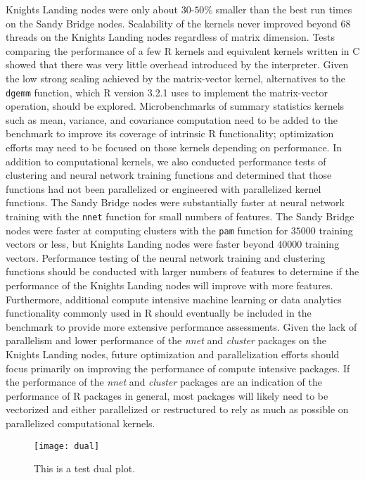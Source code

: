   Knights Landing nodes were only about $30$-$50\%$ smaller than the best run
  times on the Sandy Bridge nodes.
Scalability of the kernels never improved beyond $68$ threads on the Knights
  Landing nodes regardless of matrix dimension.
Tests comparing the performance of a few R kernels and equivalent kernels
  written in C showed that there was very little overhead introduced by the
  interpreter.
Given the low strong scaling achieved by the matrix-vector kernel, alternatives
  to the \texttt{dgemm} function, which R version 3.2.1 uses to implement the
  matrix-vector operation, should be explored.
Microbenchmarks of summary statistics kernels such as mean, variance, and
  covariance computation need to be added to the benchmark to improve its
  coverage of intrinsic R functionality; optimization efforts may need to be
  focused on those kernels depending on performance.
In addition to computational kernels, we also conducted performance tests of
  clustering and neural network training functions and determined that those
  functions had not been parallelized or engineered with parallelized kernel
  functions.
The Sandy Bridge nodes were substantially faster at neural network training with
  the \texttt{nnet} function for small numbers of features.
The Sandy Bridge nodes were faster at computing clusters with the \texttt{pam}
  function for $35000$ training vectors or less, but Knights Landing nodes were
  faster beyond $40000$ training vectors.
Performance testing of the neural network training and clustering functions
  should be conducted with larger numbers of features to determine if the
  performance of the Knights Landing nodes will improve with more features.
Furthermore, additional compute intensive machine learning or data analytics
  functionality commonly used in R should eventually be included in the
  benchmark to provide more extensive performance assessments.
Given the lack of parallelism and lower performance of the \textit{nnet} and
  \textit{cluster} packages on the Knights Landing nodes, future optimization
  and parallelization efforts should focus primarily on improving the
  performance of compute intensive packages.
If the performance of the \textit{nnet} and \textit{cluster} packages are an
  indication of the performance of R packages in general, most packages will
  likely need to be vectorized and either parallelized or restructured to rely
  as much as possible on parallelized computational kernels.

\begin{figure}
\texttt{[image: dual]}
\caption{This is a test dual plot.}
\end{figure}

